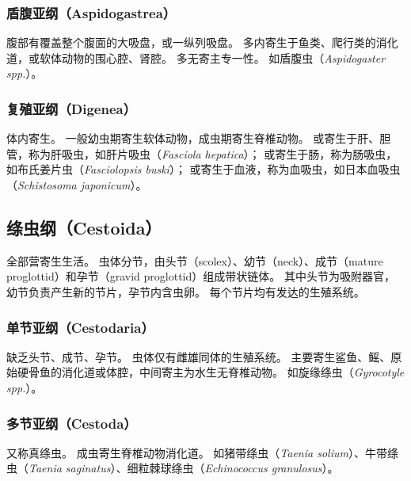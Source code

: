 \documentclass[11pt]{article}
\begin{document}
\subsubsection{盾腹亚纲（Aspidogastrea）}
腹部有覆盖整个腹面的大吸盘，或一纵列吸盘。
多内寄生于鱼类、爬行类的消化道，或软体动物的围心腔、肾腔。
多无寄主专一性。
如盾腹虫（\textit{Aspidogaster spp.}）。

\subsubsection{复殖亚纲（Digenea）}
体内寄生。
一般幼虫期寄生软体动物，成虫期寄生脊椎动物。
或寄生于肝、胆管，称为肝吸虫，如肝片吸虫（\textit{Fasciola hepatica}）；
或寄生于肠，称为肠吸虫，如布氏姜片虫（\textit{Fasciolopsis buski}）；
或寄生于血液，称为血吸虫，如日本血吸虫（\textit{Schistosoma japonicum}）。

\subsection{绦虫纲（Cestoida）}
全部营寄生生活。
虫体分节，由头节（scolex）、幼节（neck）、成节（mature proglottid）和孕节（gravid proglottid）组成带状链体。
其中头节为吸附器官，幼节负责产生新的节片，孕节内含虫卵。
每个节片均有发达的生殖系统。

\subsubsection{单节亚纲（Cestodaria）}
缺乏头节、成节、孕节。
虫体仅有雌雄同体的生殖系统。
主要寄生鲨鱼、鳐、原始硬骨鱼的消化道或体腔，中间寄主为水生无脊椎动物。
如旋缘绦虫（\textit{Gyrocotyle spp.}）。

\subsubsection{多节亚纲（Cestoda）}
又称真绦虫。
成虫寄生脊椎动物消化道。
如猪带绦虫（\textit{Taenia solium}）、牛带绦虫（\textit{Taenia saginatus}）、细粒棘球绦虫（\textit{Echinococcus granulosus}）。
\end{document}
